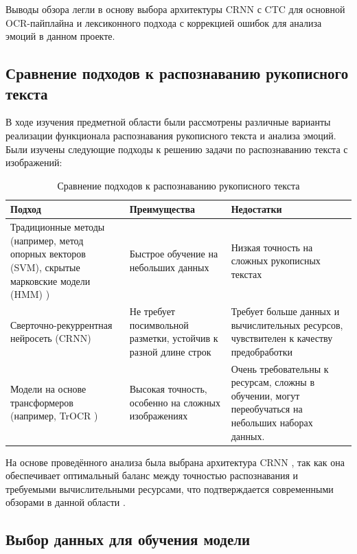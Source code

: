 \documentclass[12pt,a4paper]{article}
\begin{document}
Выводы обзора легли в основу выбора архитектуры CRNN с CTC для основной OCR-пайплайна и лексиконного
подхода с коррекцией ошибок для анализа эмоций в данном проекте. 

\subsection{Сравнение подходов к распознаванию рукописного текста}

В ходе изучения предметной области были рассмотрены различные варианты реализации
функционала распознавания рукописного текста и анализа эмоций. Были изучены следующие
подходы к решению задачи по распознаванию текста с изображений:

\begin{table}[H]
\caption{Сравнение подходов к распознаванию рукописного текста}
\label{tab:approaches_comparison}
\centering
\small
\renewcommand{\arraystretch}{1.3}
\begin{tabularx}{\linewidth}{|
>{\raggedright\arraybackslash}X|
>{\raggedright\arraybackslash}X|
>{\raggedright\arraybackslash}X|}
\hline
\textbf{Подход} & \textbf{Преимущества} & \textbf{Недостатки} \\
\hline
Традиционные методы (например, метод опорных векторов (SVM), скрытые марковские модели (HMM) \cite{hybridhmm2010}) & 
Быстрое обучение на небольших данных & 
Низкая точность на сложных рукописных текстах \\
\hline
Сверточно-рекуррентная нейросеть (CRNN) \cite{ctc2006} & 
Не требует посимвольной разметки, устойчив к разной длине строк & 
Требует больше данных и вычислительных ресурсов, чувствителен к качеству предобработки \\
\hline
Модели на основе трансформеров (например, TrOCR \cite{e2eneural2018}) &
Высокая точность, особенно на сложных изображениях &
Очень требовательны к ресурсам, сложны в обучении, могут переобучаться на небольших наборах данных. \\
\hline
\end{tabularx}
\end{table}

На основе проведённого анализа была выбрана архитектура CRNN \cite{ctc2006}, так как она
обеспечивает оптимальный баланс между точностью распознавания и требуемыми
вычислительными ресурсами, что подтверждается современными обзорами в данной области \cite{survey2023}.


\subsection{Выбор данных для обучения модели}
\end{document}
